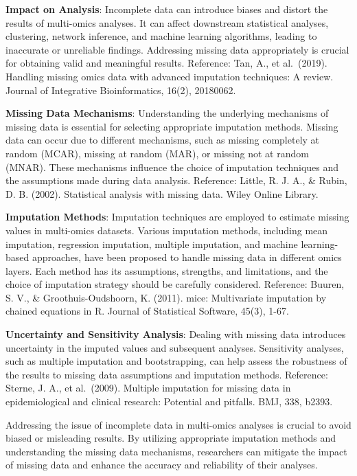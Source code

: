 \documentclass[a4paper, nobind]{templates/ociamthesis}
\begin{document}
\textbf{Impact on Analysis}: Incomplete data can introduce biases and distort the results of multi-omics analyses. It can affect downstream statistical analyses, clustering, network inference, and machine learning algorithms, leading to inaccurate or unreliable findings. Addressing missing data appropriately is crucial for obtaining valid and meaningful results. Reference: Tan, A., et al.~(2019). Handling missing omics data with advanced imputation techniques: A review. Journal of Integrative Bioinformatics, 16(2), 20180062.

\textbf{Missing Data Mechanisms}: Understanding the underlying mechanisms of missing data is essential for selecting appropriate imputation methods. Missing data can occur due to different mechanisms, such as missing completely at random (MCAR), missing at random (MAR), or missing not at random (MNAR). These mechanisms influence the choice of imputation techniques and the assumptions made during data analysis. Reference: Little, R. J. A., \& Rubin, D. B. (2002). Statistical analysis with missing data. Wiley Online Library.

\textbf{Imputation Methods}: Imputation techniques are employed to estimate missing values in multi-omics datasets. Various imputation methods, including mean imputation, regression imputation, multiple imputation, and machine learning-based approaches, have been proposed to handle missing data in different omics layers. Each method has its assumptions, strengths, and limitations, and the choice of imputation strategy should be carefully considered. Reference: Buuren, S. V., \& Groothuis-Oudshoorn, K. (2011). mice: Multivariate imputation by chained equations in R. Journal of Statistical Software, 45(3), 1-67.

\textbf{Uncertainty and Sensitivity Analysis}: Dealing with missing data introduces uncertainty in the imputed values and subsequent analyses. Sensitivity analyses, such as multiple imputation and bootstrapping, can help assess the robustness of the results to missing data assumptions and imputation methods. Reference: Sterne, J. A., et al.~(2009). Multiple imputation for missing data in epidemiological and clinical research: Potential and pitfalls. BMJ, 338, b2393.

Addressing the issue of incomplete data in multi-omics analyses is crucial to avoid biased or misleading results. By utilizing appropriate imputation methods and understanding the missing data mechanisms, researchers can mitigate the impact of missing data and enhance the accuracy and reliability of their analyses.
\end{document}
